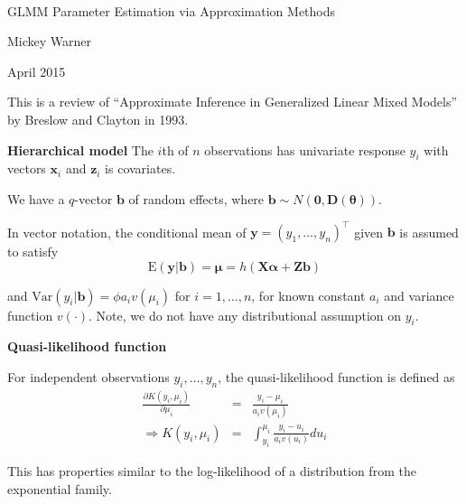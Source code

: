 \documentclass[mathserif, 11pt, t]{beamer}
\newcommand{\E}{\mathrm{E}}
\newcommand{\Var}{\mathrm{Var}}
\newcommand{\m}[1]{\mathbf{\bm{#1}}}
\renewcommand{\subtitle}[1]{\vspace{0.45cm}\textcolor{bluegreen}{
    {\textbf{#1}}}\vspace{0.15cm}\newline}
\begin{document}
\begin{center}
\ \\ [-0.5in]
\vfill
\bigskip
\bigskip
\bigskip
\bigskip
\bigskip

\begin{LARGE}
\begin{center}
GLMM Parameter Estimation via Approximation Methods
\end{center}
\end{LARGE}
\vfill

\begin{center}
Mickey Warner
\end{center}
\vfill
April 2015
\bigskip
\bigskip
\bigskip
\vfill
\ \\ [-0.5in]
\end{center}

\begin{frame}
\subtitle{}
This is a review of ``Approximate Inference in Generalized Linear Mixed Models'' by Breslow and Clayton in 1993.

\end{frame}

\begin{frame}
\subtitle{Hierarchical model}
The $i$th of $n$ observations has univariate response $y_i$ with vectors $\m{x}_i$ and $\m{z}_i$ is covariates.
\bigskip

We have a $q$-vector $\m{b}$ of random effects, where $\m{b}\sim N(\m{0},\m{D}(\m{\theta}))$.
\bigskip

In vector notation, the conditional mean of $\m{y}=(y_1,\ldots,y_n)^\top$ given $\m{b}$ is assumed to satisfy
\[ \E(\m{y}|\m{b}) = \m{\mu} = h(\m{X}\m{\alpha} + \m{Z}\m{b}) \]

and $\Var(y_i|\m{b})=\phi a_iv(\mu_i)$ for $i=1,\ldots,n$, for known constant $a_i$ and variance function $v(\cdot)$. Note, we do not have any distributional assumption on $y_i$.

\end{frame}

\begin{frame}
\subtitle{Quasi-likelihood function}

For independent observations $y_i,\ldots,y_n$, the quasi-likelihood function is defined as
\begin{eqnarray*}
\frac{\partial K(y_i, \mu_i)}{\partial \mu_i} &=& \frac{y_i-\mu_i}{a_i v(\mu_i)} \\
\Longrightarrow K(y_i,\mu_i)&=&\int_{y_i}^{\mu_i}\frac{y_i-u_i}{a_i v(u_i)}du_i
\end{eqnarray*}

This has properties similar to the log-likelihood of a distribution from the exponential family.


\end{frame}
\end{document}
